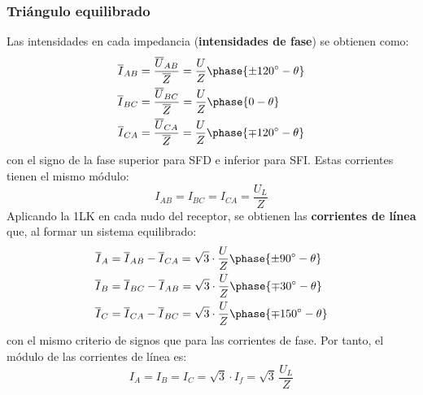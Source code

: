 	\subsubsection{Triángulo equilibrado}
	Las intensidades en cada impedancia (\textbf{intensidades de
          fase}) se obtienen como:
	\begin{align*}
          \overline{I}_{AB} &= \frac{\overline{U}_{AB}}{\overline{Z}} = \frac{U}{Z}\phase{{\pm 120^\circ} - \theta} \\
          \overline{I}_{BC} &= \frac{\overline{U}_{BC}}{\overline{Z}} = \frac{U}{Z}\phase{0 - \theta}\\
          \overline{I}_{CA} &= \frac{\overline{U}_{CA}}{\overline{Z}} = \frac{U}{Z}\phase{{\mp 120^\circ} - \theta}
        \end{align*}
        con el signo de la fase superior para SFD e inferior para
        SFI. Estas corrientes tienen el mismo módulo:
        \begin{equation}
          \boxed{{I_{AB}}={I_{BC}}={I_{CA}} = \dfrac{U_L}{Z}}
        \end{equation}
        Aplicando la 1LK en cada nudo del receptor, se obtienen las
        \textbf{corrientes de línea} que, al formar un sistema
        equilibrado:
        \begin{align}
          \overline{I}_A &= \overline{I}_{AB} - \overline{I}_{CA} = \sqrt{3} \cdot \frac{U}{Z}\phase{{\pm 90^\circ} - \theta}\\
          \overline{I}_B &= \overline{I}_{BC} - \overline{I}_{AB} = \sqrt{3} \cdot \frac{U}{Z}\phase{{\mp 30^\circ} - \theta}\\
          \overline{I}_C &= \overline{I}_{CA} - \overline{I}_{BC} = \sqrt{3} \cdot \frac{U}{Z}\phase{{\mp 150^\circ} - \theta}
        \end{align}
        con el mismo criterio de signos que para las corrientes de
        fase. Por tanto, el módulo de las corrientes de línea es:
        \begin{equation}
          \boxed{{I}_A = {I}_B = {I}_C = \sqrt{3} \cdot I_f = \sqrt{3}\,\frac{U_L}{Z}}
        \end{equation}
	
